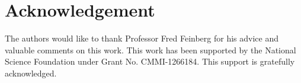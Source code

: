 \documentclass[onecolumn,11pt]{article}
\newcommand{\cutsectionup}{\vspace*{-0.1in}}
\newcommand{\cutsectionup}{}
\begin{document}

\cutsectionup
\section*{Acknowledgement}
\label{sec:ack} The authors would like to thank Professor Fred Feinberg for
his advice and valuable comments on this work. This work has been supported by
the National Science Foundation under Grant No. CMMI-1266184. This support is
gratefully acknowledged.


\end{document}
